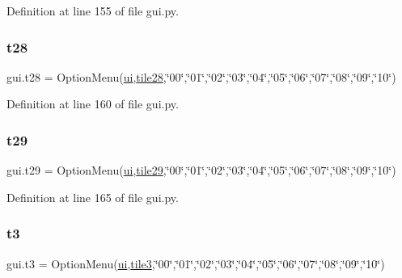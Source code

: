 Definition at line 155 of file gui.\+py.

\mbox{\label{namespacegui_aa638ea13e25a3927cd4417a1105842b4}} 
\subsubsection{\texorpdfstring{t28}{t28}}
{\footnotesize\ttfamily gui.\+t28 = Option\+Menu(\mbox{\hyperlink{namespacegui_a40ab7281456eadbea2dc2038f5c24fa1}{ui}},\mbox{\hyperlink{namespacegui_a54e9c1d0531a0815ce07491e16b116f0}{tile28}},\char`\"{}00\char`\"{},\char`\"{}01\char`\"{},\char`\"{}02\char`\"{},\char`\"{}03\char`\"{},\char`\"{}04\char`\"{},\char`\"{}05\char`\"{},\char`\"{}06\char`\"{},\char`\"{}07\char`\"{},\char`\"{}08\char`\"{},\char`\"{}09\char`\"{},\char`\"{}10\char`\"{})}



Definition at line 160 of file gui.\+py.

\mbox{\label{namespacegui_a342be2f321cfe086e652376fcf209ea1}} 
\subsubsection{\texorpdfstring{t29}{t29}}
{\footnotesize\ttfamily gui.\+t29 = Option\+Menu(\mbox{\hyperlink{namespacegui_a40ab7281456eadbea2dc2038f5c24fa1}{ui}},\mbox{\hyperlink{namespacegui_ab115038ed3d4211efcc93877e730dfbc}{tile29}},\char`\"{}00\char`\"{},\char`\"{}01\char`\"{},\char`\"{}02\char`\"{},\char`\"{}03\char`\"{},\char`\"{}04\char`\"{},\char`\"{}05\char`\"{},\char`\"{}06\char`\"{},\char`\"{}07\char`\"{},\char`\"{}08\char`\"{},\char`\"{}09\char`\"{},\char`\"{}10\char`\"{})}



Definition at line 165 of file gui.\+py.

\mbox{\label{namespacegui_a1098688efc4d42953e22acb4e81138ac}} 
\subsubsection{\texorpdfstring{t3}{t3}}
{\footnotesize\ttfamily gui.\+t3 = Option\+Menu(\mbox{\hyperlink{namespacegui_a40ab7281456eadbea2dc2038f5c24fa1}{ui}},\mbox{\hyperlink{namespacegui_a1a6bb0561f02127f121022bf818450b2}{tile3}},\char`\"{}00\char`\"{},\char`\"{}01\char`\"{},\char`\"{}02\char`\"{},\char`\"{}03\char`\"{},\char`\"{}04\char`\"{},\char`\"{}05\char`\"{},\char`\"{}06\char`\"{},\char`\"{}07\char`\"{},\char`\"{}08\char`\"{},\char`\"{}09\char`\"{},\char`\"{}10\char`\"{})}



